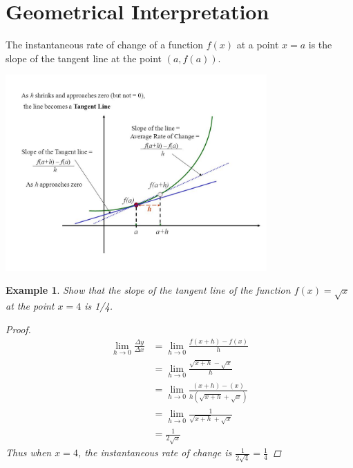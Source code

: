 \documentclass{article}
\newtheorem{ex}{Example}
\begin{document}
\section{Geometrical Interpretation}
The instantaneous rate of change of a function $f(x)$ at a point $x=a$ is the slope of the tangent line at the point $(a,f(a))$.
\begin{center}
	\includegraphics*[width=10cm]{tangent_line.jpg}
\end{center} 

\begin{ex}
	Show that the slope of the tangent line of the function $f(x) = \sqrt{x}$ at the point $x=4$ is 1/4.
	\begin{proof}
		\begin{align*}
		\lim_{h\to 0}\frac{\Delta y}{\Delta x} 
		&= \lim_{h\to 0}\frac{f(x+h)-f(x)}{h}\\
		&= \lim_{h\to 0}\frac{\sqrt{x+h}-\sqrt{x}}{h}\\
		&= \lim_{h\to 0}\frac{(x+h)-(x)}{h(\sqrt{x+h}+\sqrt{x})}\\
		&= \lim_{h\to 0}\frac{1}{\sqrt{x+h}+\sqrt{x}}\\
		&= \frac{1}{2\sqrt{x}}
		\end{align*}
		Thus when $x=4$, the instantaneous rate of change is $\frac{1}{2\sqrt{4}}=\frac{1}{4}$ 
	\end{proof}
\end{ex}
\end{document}
